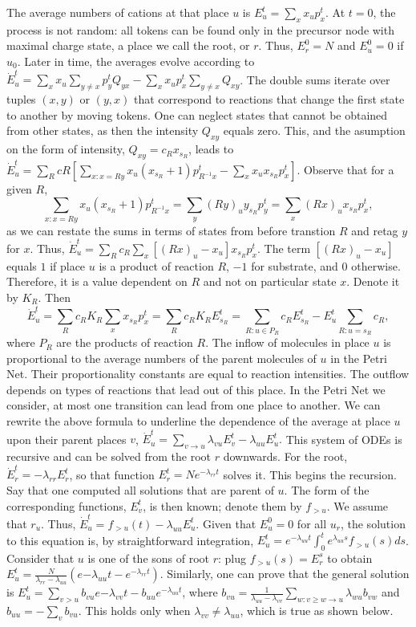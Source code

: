 \documentclass{llncs}
\begin{document}
        The average numbers of cations at that place $u$ is $E_u^t= \sum_x x_up_x^t$. At $t=0$, the process is not random: all tokens can be found only in the precursor node with maximal charge state, a place we call the root, or $r$. Thus, $E_r^0=N$ and $E_u^0=0$ if $u_0$. Later in time, the averages evolve according to $\dot E_u^t=\sum_x x_u \sum_{y\not=x} p_y^t Q_{yx} -\sum_x x_u p_x^t \sum_{y\not=x} Q_{xy}$. The double sums iterate over tuples $(x,y)$ or $(y,x)$ that correspond to reactions that change the first state to another by moving tokens. One can neglect states that cannot be obtained from other states, as then the intensity $Q_{xy}$ equals zero.
        This, and the asumption on the form of intensity, $Q_{xy}=c_Rx_{s_R}$, leads to $\dot E_u^t = \sum_R cR \left[ \sum_{x:x=Ry}  x_u (x_{s_R}+1) p_{R^{-1}x}^t- \sum_{x} x_u x_{s_R} p_x^t \right]$.
        Observe that for a given $R$,
                $$\sum_{x:x=Ry} x_u (x_{s_R}+1) p_{R^{-1}x}^t = \sum_{y}  (Ry)_u y_{s_R} p_y^t = \sum_x (Rx)_u x_{s_R} p_x^t,$$
        as we can restate the sums in terms of states from before transtion $R$ and retag $y$ for $x$. Thus, $\dot E_u^t = \sum_R c_R \sum_x   \left[(Rx)_u-x_u \right] x_{s_R} p_x^t$. The term $\left[(Rx)_u-x_u\right]$ equals $1$ if place $u$ is a product of reaction $R$, $-1$ for substrate, and $0$ otherwise. Therefore, it is a value dependent on $R$ and not on particular state $x$. Denote it by $K_R$. Then
                $$\dot E_u^t = \sum_R c_R K_R \sum_x x_{s_R} p_x^t = \sum_R c_R K_R E_{s_R}^t = \sum_{R:u\in P_R} c_R E_{s_R}^t - E_u^t \sum_{R: u=s_R}c_R,$$
        where $P_R$ are the products of reaction $R$. The inflow of molecules in place $u$ is proportional to the average numbers of the parent molecules of $u$ in the Petri Net. Their proportionality constants are equal to reaction intensities. The outflow depends on types of reactions that lead out of this place. In the Petri Net we consider, at most one transition can lead from one place to another. We can rewrite the above formula to underline the dependence of the average at place $u$ upon their parent places $v$, $ \dot E_u^t = \sum_{v\rightarrow u} \lambda_{vu} E_v^t - \lambda_{uu}E_u^t.$
        This system of ODEs is recursive and can be solved from the root $r$ downwards. For the root, $\dot E_r^t=-\lambda_{rr} E_r^t$, so that function $E_r^t= Ne^{-\lambda_{rr}t}$ solves it. This begins the recursion. Say that one computed all solutions that are parent of $u$. The form of the corresponding functions, $E_v^t$, is then known; denote them by $f_{>u}$. We assume that $r_u$. Thus, $\dot E_u^t=f_{>u}(t)-\lambda_{uu} E_u^t$. Given that $E_u^0=0$ for all $u_r$, the solution to this equation is, by straightforward integration, $E_u^t=e^{-\lambda_{uu}t} \int_0^t e^{\lambda_{uu}s} f_{>u}(s)ds$.
        Consider that $u$ is one of the sons of root $r$: plug $f_{>u}(s)=E_r^s$ to obtain $E_u^t= \frac{N}{\lambda_{rr}-\lambda_{uu}}(e{-\lambda_{uu}t}-e^{-\lambda_{rr}t})$. Similarly, one can prove that the general solution is $E_u^t=\sum_{v>u}b_{vu}e{-\lambda_{vv}t}-b_{uu}e^{-\lambda_{uu}t}$, where $b_{vu}= \frac{1}{\lambda_{uu}-\lambda_{vv}} \sum_{w: v\geq w \rightarrow u} \lambda_{wu}b_{vw}$ and  $b_{uu}=-\sum_v b_{vu}.$
        This holds only when $\lambda_{vv}\not=\lambda_{uu}$, which is true as shown below.
\end{document}
